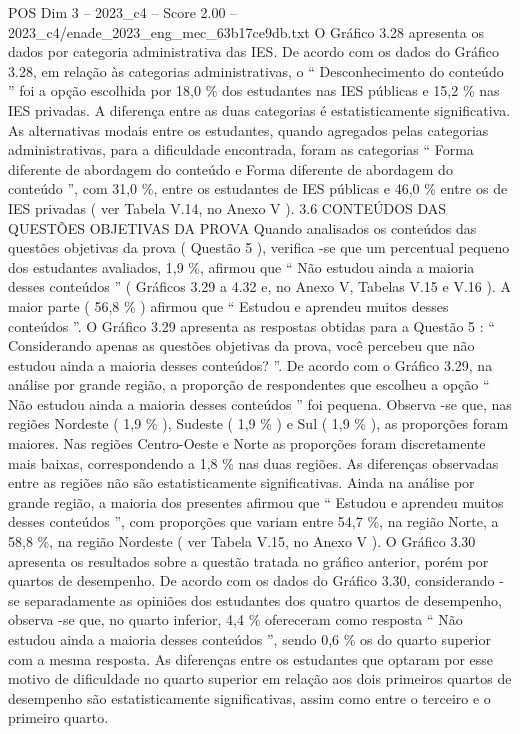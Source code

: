 \begin{textsample}{POS Dim 3 – 2023\_c4 – Score 2.00 – 2023\_c4/enade\_2023\_eng\_mec\_63b17ce9db.txt}
O Gráfico 3.28 apresenta os dados por categoria administrativa das IES.
De acordo com os dados do Gráfico 3.28, em relação às categorias administrativas, o “ Desconhecimento do conteúdo ” foi a opção escolhida por 18,0 \% dos estudantes nas IES públicas e 15,2 \% nas IES privadas.
A diferença entre as duas categorias é estatisticamente significativa.
As alternativas modais entre os estudantes, quando agregados pelas categorias administrativas, para a dificuldade encontrada, foram as categorias “ Forma diferente de abordagem do conteúdo e Forma diferente de abordagem do conteúdo ”, com 31,0 \%, entre os estudantes de IES públicas e 46,0 \% entre os de IES privadas ( ver Tabela V.14, no Anexo V ). 3.6 CONTEÚDOS DAS QUESTÕES OBJETIVAS DA PROVA Quando analisados os conteúdos das questões objetivas da prova ( Questão 5 ), verifica -se que um percentual pequeno dos estudantes avaliados, 1,9 \%, afirmou que “ Não estudou ainda a maioria desses conteúdos ” ( Gráficos 3.29 a 4.32 e, no Anexo V, Tabelas V.15 e V.16 ).
A maior parte ( 56,8 \% ) afirmou que “ Estudou e aprendeu muitos desses conteúdos ”.
O Gráfico 3.29 apresenta as respostas obtidas para a Questão 5 : “ Considerando apenas as questões objetivas da prova, você percebeu que não estudou ainda a maioria desses conteúdos? ”.
De acordo com o Gráfico 3.29, na análise por grande região, a proporção de respondentes que escolheu a opção “ Não estudou ainda a maioria desses conteúdos ” foi pequena.
Observa -se que, nas regiões Nordeste ( 1,9 \% ), Sudeste ( 1,9 \% ) e Sul ( 1,9 \% ), as proporções foram maiores.
Nas regiões Centro-Oeste e Norte as proporções foram discretamente mais baixas, correspondendo a 1,8 \% nas duas regiões.
As diferenças observadas entre as regiões não são estatisticamente significativas.
Ainda na análise por grande região, a maioria dos presentes afirmou que “ Estudou e aprendeu muitos desses conteúdos ”, com proporções que variam entre 54,7 \%, na região Norte, a 58,8 \%, na região Nordeste ( ver Tabela V.15, no Anexo V ).
O Gráfico 3.30 apresenta os resultados sobre a questão tratada no gráfico anterior, porém por quartos de desempenho.
De acordo com os dados do Gráfico 3.30, considerando -se separadamente as opiniões dos estudantes dos quatro quartos de desempenho, observa -se que, no quarto inferior, 4,4 \% ofereceram como resposta “ Não estudou ainda a maioria desses conteúdos ”, sendo 0,6 \% os do quarto superior com a mesma resposta.
As diferenças entre os estudantes que optaram por esse motivo de dificuldade no quarto superior em relação aos dois primeiros quartos de desempenho são estatisticamente significativas, assim como entre o terceiro e o primeiro quarto.

\end{textsample}
